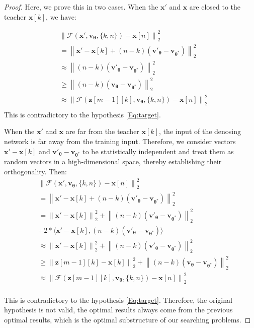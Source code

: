 \documentclass[10pt,twocolumn,letterpaper]{article}
\newcommand{\norm}[1]{\left\lVert#1\right\rVert}
\begin{document}
\begin{proof} 
    Here, we prove this in two cases. When the $\bm{x'}$ and $\bm{x}$ are closed to the teacher $\bm{x}[k]$, we have:
    
 


    
        \begin{align}
             & \norm{\mathcal{F}(\bm{x'}, \bm{v_\theta},\{k,n\}) - \bm{x}[n]}^2_2 \\
             & = \norm{\bm{x'}-\bm{x}[k] + (n-k)(\bm{v'_{\theta}} - \bm{v_{\theta^*}})}^2_2 \\
             & \approx \norm{(n-k)(\bm{v'_{\theta}} - \bm{v_{\theta^*}})}^2_2 \\
             & \geq   \norm{(n-k)(\bm{v_{\theta}} - \bm{v_{\theta^*}})}^{2}_2 \\
             & \approx \norm{\mathcal{F}(\bm{z}[m-1][k], \bm{v_\theta}, \{k,n\}) - \bm{x}[n]}^2_2 \\
        \end{align}
        This is contradictory to the hypothesis \cref{Eq:target}.

        When the $\bm{x'}$ and $\bm{x}$ are far from the teacher $\bm{x}[k]$, the input of the denosing network is far away from the training input. Therefore, we consider vectors $\bm{x'}-\bm{x}[k]$ and $\bm{v'_{\theta}} - \bm{v_{\theta^*}}$ to be statistically independent and treat them as random vectors in a high-dimensional space, thereby establishing their orthogonality. Then:
        \begin{align}
             & \norm{\mathcal{F}(\bm{x'}, \bm{v_\theta},\{k,n\}) - \bm{x}[n]}^2_2 \\
             & = \norm{\bm{x'}-\bm{x}[k] + (n-k)(\bm{v'_{\theta}} - \bm{v_{\theta^*}})}^2_2 \\
             & = \norm{\bm{x'}-\bm{x}[k]}^2_2 + \norm{(n-k)(\bm{v'_{\theta}} - \bm{v_{\theta^*}})}^2_2 \\ 
             & + 2*\langle \bm{x'} - \bm{x}[k], (n-k)(\bm{v'_{\theta}} - \bm{v_{\theta^*}}) \rangle \\
             & \approx \norm{\bm{x'}-\bm{x}[k]}^2_2 + \norm{(n-k)(\bm{v'_{\theta}} - \bm{v_{\theta^*}})}^2_2 \label{eq:inner_product} \\
             & \geq \norm{\bm{z}[m-1][k] - \bm{x}[k]}^2_2 +  \norm{(n-k)(\bm{v_{\theta}} - \bm{v_{\theta^*}})}^{2}_2 \\
             & \approx \norm{\mathcal{F}(\bm{z}[m-1][k], \bm{v_\theta}, \{k,n\}) - \bm{x}[n]}^2_2 \\
        \end{align}

        This is contradictory to the hypothesis \cref{Eq:target}. Therefore, the original hypothesis is not valid, the optimal results always come from the previous optimal results, which is the optimal substructure of our searching problems.
    \end{proof}
\end{document}
